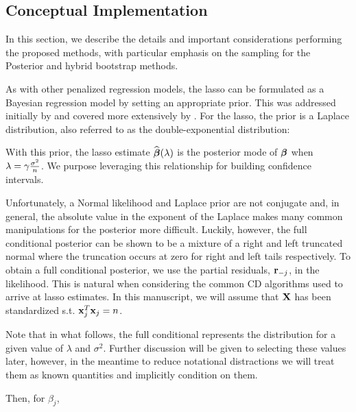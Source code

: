 \subsection{Conceptual Implementation}
\label{Sec:full-cond}

In this section, we describe the details and important considerations performing the proposed methods, with particular emphasis on the sampling for the Posterior and hybrid bootstrap methods.

As with other penalized regression models, the lasso can be formulated as a Bayesian regression model by setting an appropriate prior. This was addressed initially by \cite{Tibshirani1996} and covered more extensively by \cite{Park2008}. For the lasso, the prior is a Laplace distribution, also referred to as the double-exponential distribution:


With this prior, the lasso estimate $\widehat{\boldsymbol{\beta}}(\lambda)$ is the posterior mode of $\boldsymbol{\beta}$ when $\lambda = \gamma \frac{\sigma^2}{n}$. We purpose leveraging this relationship for building confidence intervals.

Unfortunately, a Normal likelihood and Laplace prior are not conjugate and, in general, the absolute value in the exponent of the Laplace makes many common manipulations for the posterior more difficult. Luckily, however, the full conditional posterior can be shown to be a mixture of a right and left truncated normal where the truncation occurs at zero for right and left tails respectively. To obtain a full conditional posterior, we use the partial residuals, $\mathbf{r}_{-j}$, in the likelihood. This is natural when considering the common CD algorithms used to arrive at lasso estimates. In this manuscript, we will assume that $\mathbf{X}$ has been standardized s.t. $\mathbf{x}_j^T\mathbf{x}_j = n$.

Note that in what follows, the full conditional represents the distribution for a given value of $\lambda$ and $\sigma^2$. Further discussion will be given to selecting these values later, however, in the meantime to reduce notational distractions we will treat them as known quantities and implicitly condition on them.

Then, for $\beta_j$,


